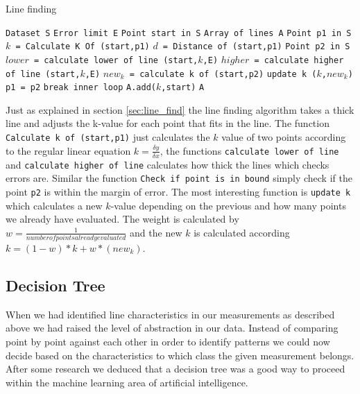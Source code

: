 \documentclass[a4paper, 10pt, conference]{ieeeconf}      %
\begin{document}
\begin{algorithm}
  \caption{\label{lineFinding}Line finding}
  \begin{algorithmic}[1]
      \State \texttt{Dataset S}
      \State \texttt{Error limit E}
      \State \texttt{Point start in S}
      \State \texttt{Array of lines A}
      	\State \texttt{Point p1 in S}
      	\State \texttt{$k$ = Calculate K Of (start,p1)}
      	\State \texttt{$d$ = Distance of (start,p1)}
      		\State \texttt{Point p2 in S}
      		\State \texttt{$lower$ = calculate lower of line (start,$k$,E)}
      		\State \texttt{$higher$ = calculate higher of line (start,$k$,E)}
      			\State \texttt{$new_k$ = calculate k of (start,p2)}
      			\State \texttt{update k ($k$,$new_k$)}
      			\State \texttt{p1 = p2}
      		\Else
      			\State \texttt{break inner loop}
      		\EndIf
      	\EndWhile
      		\State \texttt{A.add($k$,start)}
      	\EndIf
      \EndWhile
      \Return \texttt{A}
  \end{algorithmic}
\end{algorithm}

Just as explained in section \ref{sec:line_find} the line finding algorithm takes a thick line and adjusts the k-value for each point that fits in the line. The function \texttt{Calculate k of (start,p1)} just calculates the $k$ value of two points according to the regular linear equation $k = \frac{\delta y}{\delta x}$, the functions \texttt{calculate lower of line} and \texttt{calculate higher of line} calculates how thick the lines which checks errors are. Similar the function \texttt{Check if point is in bound} simply check if the point \texttt{p2} is within the margin of error. The most interesting function is \texttt{update k} which calculates a new $k$-value depending on the previous and how many points we already have evaluated. The weight is calculated by $w = \frac{1}{number of points already evaluated}$ and the new $k$ is calculated according $k = (1-w)*k + w*(new_k)$.

\subsection{Decision Tree}
When we had identified line characteristics in our measurements as described above we had raised the level of abstraction in our data. Instead of comparing point by point against each other in order to identify patterns we could now decide based on the characteristics to which class the given measurement belongs. After some research we deduced that a decision tree was a good way to proceed within the machine learning area of artificial intelligence.
\end{document}
